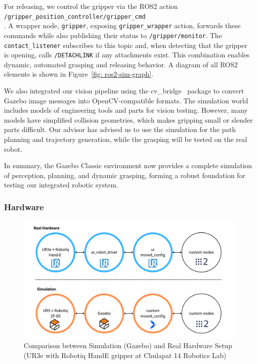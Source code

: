 \documentclass[12pt]{extarticle}
\begin{document}
For releasing, we control the gripper via the ROS2 action\\\texttt{/gripper\_position\_controller/gripper\_cmd}\\. A wrapper node, \texttt{gripper}, exposing \texttt{gripper\_wrapper} action, forwards these commands while also publishing their status to \texttt{/gripper/monitor}. The \texttt{contact\_listener} subscribes to this topic and, when detecting that the gripper is opening, calls \texttt{/DETACHLINK} if any attachments exist. This combination enables dynamic, automated grasping and releasing behavior. A diagram of all ROS2 elements is shown in Figure~\ref{fig: ros2-sim-graph}.

We also integrated our vision pipeline using the cv\_bridge~\cite{cv_bridge} package to convert Gazebo image messages into OpenCV-compatible formats. The simulation world includes models of engineering tools and parts for vision testing. However, many models have simplified collision geometries, which makes gripping small or slender parts difficult. Our advisor has advised us to use the simulation for the path planning and trajectory generation, while the grasping will be tested on the real robot.

In summary, the Gazebo Classic environment now provides a complete simulation of perception, planning, and dynamic grasping, forming a robust foundation for testing our integrated robotic system.

\subsubsection{Hardware}

\begin{figure}[h]
\centering
\includegraphics[width=\linewidth]{images/sim_vs_real.png}
\caption{Comparison between Simulation (Gazebo) and Real Hardware Setup (UR3e with Robotiq HandE gripper at Chulapat 14 Robotics Lab)}
\label{fig: sim-vs-real}
\end{figure}
\end{document}

